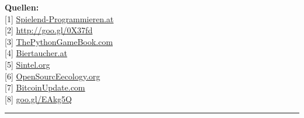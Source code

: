 \documentclass[10pt,a4paper,ngerman,twoside]{article} %
\newcommand{\SepRule}{\noindent	%
\begin{center}
\rule{250pt}{1pt} %
\end{center}
}
\begin{document}
\textbf{Quellen:} \\
{[}1{]} \href{http://spielend-programmieren.at}{Spielend-Programmieren.at} \\
{[}2{]} \href{http://spielend-programmieren.at/de:tutorials:start}{http://goo.gl/0X37fd} \\
{[}3{]} \href{http://thepythongamebook.com}{ThePythonGameBook.com} \\
{[}4{]} \href{http://biertaucher.at}{Biertaucher.at} \\
{[}5{]} \href{http://www.sintel.org/}{Sintel.org} \\
{[}6{]} \href{http://opensourceecology.org/}{OpenSourcEecology.org} \\
{[}7{]} \href{http://www.bitcoinupdate.com/}{BitcoinUpdate.com} \\
{[}8{]} \href{http://www.amazon.de/gp/product/1449388396/ref=as_li_ss_tl?ie=UTF8&camp=1638&creative=19454&creativeASIN=1449388396&linkCode=as2&tag=spielendprogr-21}{goo.gl/EAkg5Q} \\




\SepRule
\end{document}
